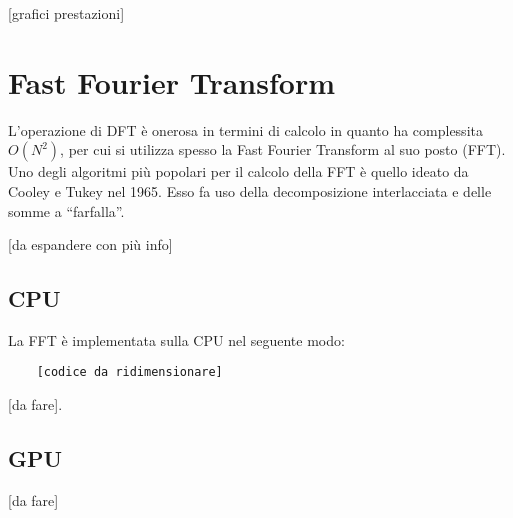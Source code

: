 [grafici prestazioni]

\section{Fast Fourier Transform}
L'operazione di DFT è onerosa in termini di calcolo in quanto ha complessita $O(N^2)$, per cui si utilizza spesso la Fast Fourier Transform al suo posto (FFT). Uno degli algoritmi più popolari per il calcolo della FFT è quello ideato da Cooley e Tukey nel 1965. Esso fa uso della decomposizione interlacciata e delle somme a ``farfalla''.

[da espandere con più info]

\subsection{CPU}
La FFT è implementata sulla CPU nel seguente modo:

\begin{lstlisting}
    [codice da ridimensionare]
\end{lstlisting}

[da fare].

\subsection{GPU}

[da fare]
